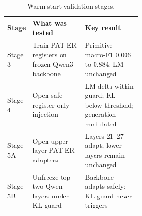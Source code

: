 \begin{table}[H]
\caption{Warm-start validation stages.\label{tab:warmstart_stages}}
\footnotesize
\begin{tabularx}{\textwidth}{@{}p{0.16\linewidth}p{0.39\linewidth}X@{}}
\toprule
\textbf{Stage} & \textbf{What was tested} & \textbf{Key result} \\
\midrule
Stage 3 & Train PAT-ER registers on frozen Qwen3 backbone & Primitive macro-F1 0.006 to 0.884; LM unchanged \\
Stage 4 & Open safe register-only injection & LM delta within guard; KL below threshold; generation modulated \\
Stage 5A & Open upper-layer PAT-ER adapters & Layers 21--27 adapt; lower layers remain unchanged \\
Stage 5B & Unfreeze top two Qwen layers under KL guard & Backbone adapts safely; KL guard never triggers \\
\bottomrule
\end{tabularx}
\end{table}

